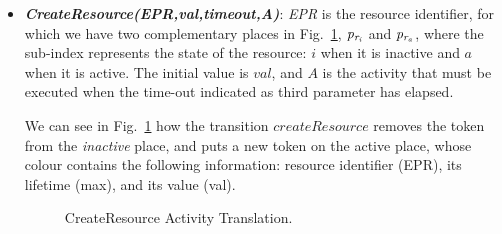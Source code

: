 \begin{itemize}
\item {\bf {\it CreateResource(EPR,val,timeout,A)}}:
{\em EPR} is the resource identifier, for which we have two complementary places in Fig.~\ref{createresource}, ${\it p_{r_i}}$ and ${\it p_{r_a}}$, where the sub-index represents the state of the resource: $i$ when it is inactive and $a$ when it is active. The initial value is $val$, and $A$ is the activity that must be executed when the time-out indicated as third parameter has elapsed.

We can see in Fig.~\ref{createresource} how the transition $createResource$ removes the token from the {\em inactive} place, and puts a new token on the active place, whose colour contains the following information: resource identifier (EPR), its lifetime (max), and its value (val). %

\begin{figure}[!ht]
\begin{center}
\end{center}
\caption{\label{createresource} CreateResource Activity Translation.}
\end{figure}


\end{itemize}
